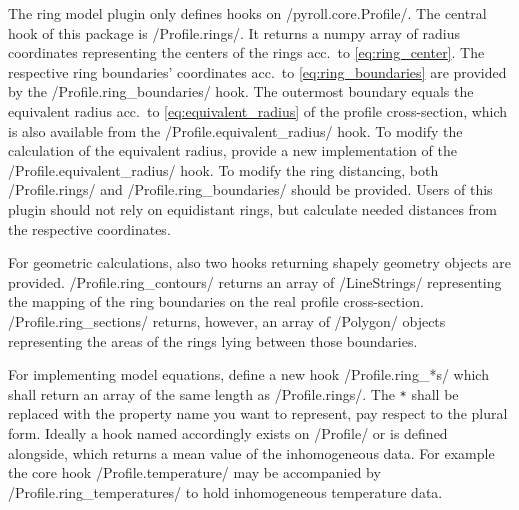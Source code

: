 \documentclass[11pt]{PyRollDocs}
\begin{document}
    The ring model plugin only defines hooks on \py/pyroll.core.Profile/.
    The central hook of this package is \py/Profile.rings/.
    It returns a numpy array of radius coordinates representing the centers of the rings acc.\ to \autoref{eq:ring_center}.
    The respective ring boundaries' coordinates acc.\ to \autoref{eq:ring_boundaries}  are provided by the \py/Profile.ring_boundaries/ hook.
    The outermost boundary equals the equivalent radius acc.\ to \autoref{eq:equivalent_radius}  of the profile cross-section, which is also available from the \py/Profile.equivalent_radius/ hook.
    To modify the calculation of the equivalent radius, provide a new implementation of the \py/Profile.equivalent_radius/ hook.
    To modify the ring distancing, both \py/Profile.rings/ and \py/Profile.ring_boundaries/ should be provided.
    Users of this plugin should not rely on equidistant rings, but calculate needed distances from the respective coordinates.

    For geometric calculations, also two hooks returning shapely geometry objects are provided.
    \py/Profile.ring_contours/ returns an array of \py/LineStrings/ representing the mapping of the ring boundaries on the real profile cross-section.
    \py/Profile.ring_sections/ returns, however, an array of \py/Polygon/ objects representing the areas of the rings lying between those boundaries.

    For implementing model equations, define a new hook \py/Profile.ring_*s/ which shall return an array of the same length as \py/Profile.rings/.
    The \texttt{*} shall be replaced with the property name you want to represent, pay respect to the plural form.
    Ideally a hook named accordingly exists on \py/Profile/ or is defined alongside, which returns a mean value of the inhomogeneous data.
    For example the core hook \py/Profile.temperature/ may be accompanied by \py/Profile.ring_temperatures/ to hold inhomogeneous temperature data.

    \printbibliography
\end{document}
